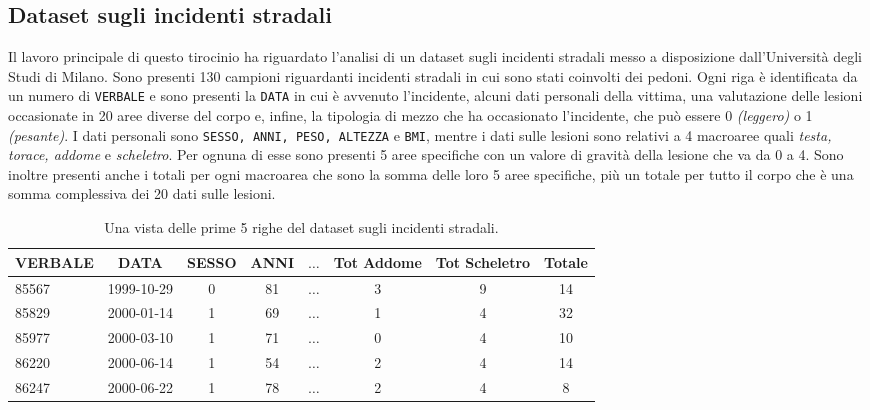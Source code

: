 \documentclass[12pt, twoside, letterpaper]{report}
\begin{document}
			
		\subsection{Dataset sugli incidenti stradali} \label{sec:incidenti}
			Il lavoro principale di questo tirocinio ha riguardato l'analisi di un dataset sugli incidenti stradali messo a disposizione dall'Università degli Studi di Milano. Sono presenti 130 campioni riguardanti incidenti stradali in cui sono stati coinvolti dei pedoni. Ogni riga è identificata da un numero di \texttt{VERBALE} e sono presenti la \texttt{DATA} in cui è avvenuto l'incidente, alcuni dati personali della vittima, una valutazione delle lesioni occasionate in 20 aree diverse del corpo e, infine, la tipologia di mezzo che ha occasionato l'incidente, che può essere 0 \textit{(leggero)} o 1 \textit{(pesante)}. I dati personali sono \texttt{SESSO, ANNI, PESO, ALTEZZA} e \texttt{BMI}, mentre i dati sulle lesioni sono relativi a 4 macroaree quali \textit{testa, torace, addome} e \textit{scheletro}. Per ognuna di esse sono presenti 5 aree specifiche con un valore di gravità della lesione che va da 0 a 4. Sono inoltre presenti anche i totali per ogni macroarea che sono la somma delle loro 5 aree specifiche, più un totale per tutto il corpo che è una somma complessiva dei 20 dati sulle lesioni. 
			\begin{table}[h]
			\begin{tabular}{lccccccc}
			\toprule
			VERBALE & DATA &  SESSO &  ANNI & $\dots$ &  Tot Addome &  Tot Scheletro &  Totale \\
			\midrule
			85567 & 1999-10-29 &      0 &    81 &  $\dots$ &         3 &              9 &      14 \\
			85829 & 2000-01-14 &      1 &    69 &  $\dots$ &         1 &              4 &      32 \\
			85977 & 2000-03-10 &      1 &    71 &  $\dots$ &         0 &              4 &      10 \\
			86220 & 2000-06-14 &      1 &    54 &  $\dots$ &         2 &              4 &      14 \\
			86247 & 2000-06-22 &      1 &    78 &  $\dots$ &         2 &              4 &       8 \\
			\bottomrule
			\end{tabular}
			\caption{\label{tab:incidenti}Una vista delle prime 5 righe del dataset sugli incidenti stradali.}
			\end{table}
			
\end{document}
